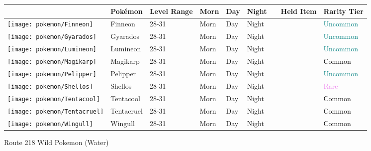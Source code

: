 \begin{longtable}{||l l l l l l l l l||}%
\hline%
&Pokémon&Level Range&Morn&Day&Night&&Held Item&Rarity Tier\\%
\hline%
\endhead%
\hline%
\texttt{[image: pokemon/Finneon]}&Finneon&28{-}31&Morn&Day&Night&&&\textcolor{teal}{%
Uncommon%
}\\%
\hline%
\texttt{[image: pokemon/Gyarados]}&Gyarados&28{-}31&Morn&Day&Night&&&\textcolor{teal}{%
Uncommon%
}\\%
\hline%
\texttt{[image: pokemon/Lumineon]}&Lumineon&28{-}31&Morn&Day&Night&&&\textcolor{teal}{%
Uncommon%
}\\%
\hline%
\texttt{[image: pokemon/Magikarp]}&Magikarp&28{-}31&Morn&Day&Night&&&\textcolor{black}{%
Common%
}\\%
\hline%
\texttt{[image: pokemon/Pelipper]}&Pelipper&28{-}31&Morn&Day&Night&&&\textcolor{teal}{%
Uncommon%
}\\%
\hline%
\texttt{[image: pokemon/Shellos]}&Shellos&28{-}31&Morn&Day&Night&&&\textcolor{violet}{%
Rare%
}\\%
\hline%
\texttt{[image: pokemon/Tentacool]}&Tentacool&28{-}31&Morn&Day&Night&&&\textcolor{black}{%
Common%
}\\%
\hline%
\texttt{[image: pokemon/Tentacruel]}&Tentacruel&28{-}31&Morn&Day&Night&&&\textcolor{black}{%
Common%
}\\%
\hline%
\texttt{[image: pokemon/Wingull]}&Wingull&28{-}31&Morn&Day&Night&&&\textcolor{black}{%
Common%
}\\%
\hline%
\end{longtable}%
\caption{Route 218 Wild Pokemon (Water)}